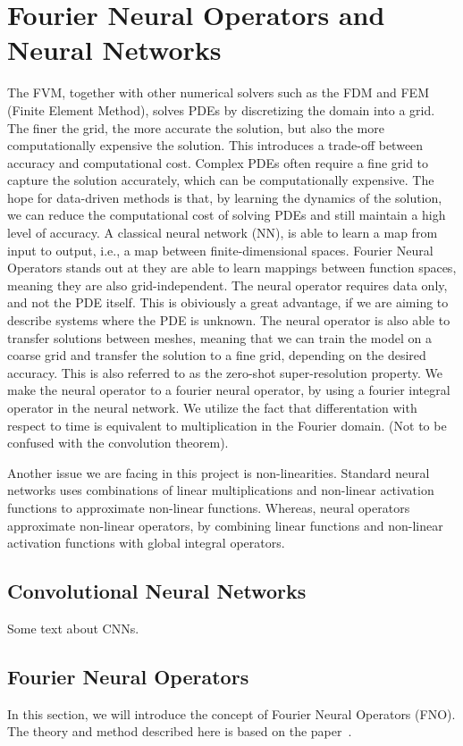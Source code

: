 \chapter{Fourier Neural Operators and Neural Networks}\label{ch:FNO+NN}
The FVM, together with other numerical solvers such as the FDM and FEM (Finite Element Method), solves PDEs by discretizing the domain into a grid.
The finer the grid, the more accurate the solution, but also the more computationally expensive the solution. This introduces a trade-off between accuracy and computational cost.
Complex PDEs often require a fine grid to capture the solution accurately, which can be computationally expensive.
The hope for data-driven methods is that, by learning the dynamics of the solution, we can reduce the computational cost of solving PDEs and still maintain a high level of accuracy.
A classical neural network (NN), is able to learn a map from input to output, i.e., a map between finite-dimensional spaces.
Fourier Neural Operators stands out at they are able to learn mappings between function spaces, meaning they are also grid-independent.
The neural operator requires data only, and not the PDE itself.
This is obiviously a great advantage, if we are aiming to describe systems where the PDE is unknown. 
The neural operator is also able to transfer solutions between meshes, meaning that we can train the model on a coarse grid and transfer the solution to a fine grid, depending on the desired accuracy.
This is also referred to as the zero-shot super-resolution property.
We make the neural operator to a fourier neural operator, by using a fourier integral operator in the neural network.
We utilize the fact that differentation with respect to time is equivalent to multiplication in the Fourier domain.
(Not to be confused with the convolution theorem).

Another issue we are facing in this project is non-linearities.
Standard neural networks uses combinations of linear multiplications and non-linear activation functions to approximate non-linear functions.
Whereas, neural operators approximate non-linear operators, by combining linear functions and non-linear activation functions with global integral operators. 

\section{Convolutional Neural Networks}
Some text about CNNs.


\section{Fourier Neural Operators}
In this section, we will introduce the concept of Fourier Neural Operators (FNO).
The theory and method described here is based on the paper~\cite{FNO_2021}.

